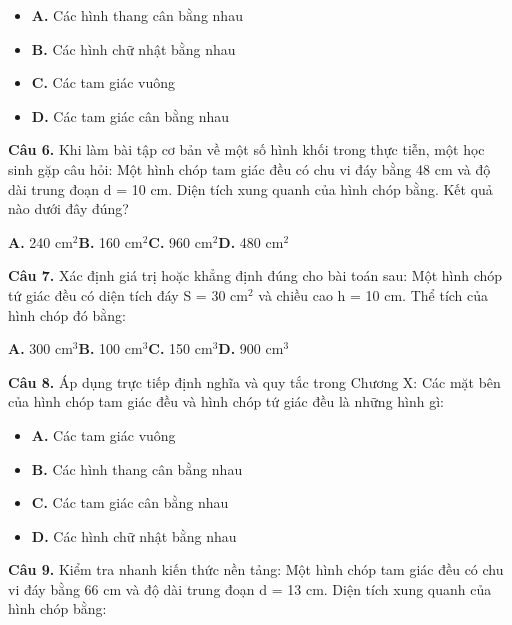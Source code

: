 \documentclass[11pt,a4paper]{article}
\begin{document}
\begin{itemize}\setlength{\itemsep}{1pt}\setlength{\parskip}{0pt}
  \item[] \textbf{A.} Các hình thang cân bằng nhau
  \item[] \textbf{B.} Các hình chữ nhật bằng nhau
  \item[] \textbf{C.} Các tam giác vuông
  \item[] \textbf{D.} Các tam giác cân bằng nhau
\end{itemize}\vspace{2pt}
\textbf{\color{primary} Câu 6.} Khi làm bài tập cơ bản về một số hình khối trong thực tiễn, một học sinh gặp câu hỏi: Một hình chóp tam giác đều có chu vi đáy bằng 48 cm và độ dài trung đoạn d = 10 cm. Diện tích xung quanh của hình chóp bằng. Kết quả nào dưới đây đúng?\par
\hspace*{1.5em}\textbf{A.} 240 cm$^2$\quad\quad \textbf{B.} 160 cm$^2$\quad\quad \textbf{C.} 960 cm$^2$\quad\quad \textbf{D.} 480 cm$^2$\par\vspace{2pt}
\textbf{\color{primary} Câu 7.} Xác định giá trị hoặc khẳng định đúng cho bài toán sau: Một hình chóp tứ giác đều có diện tích đáy S = 30 cm$^2$ và chiều cao h = 10 cm. Thể tích của hình chóp đó bằng:\par
\hspace*{1.5em}\textbf{A.} 300 cm$^3$\quad\quad \textbf{B.} 100 cm$^3$\quad\quad \textbf{C.} 150 cm$^3$\quad\quad \textbf{D.} 900 cm$^3$\par\vspace{2pt}
\textbf{\color{primary} Câu 8.} Áp dụng trực tiếp định nghĩa và quy tắc trong Chương X: Các mặt bên của hình chóp tam giác đều và hình chóp tứ giác đều là những hình gì:\par
\begin{itemize}\setlength{\itemsep}{1pt}\setlength{\parskip}{0pt}
  \item[] \textbf{A.} Các tam giác vuông
  \item[] \textbf{B.} Các hình thang cân bằng nhau
  \item[] \textbf{C.} Các tam giác cân bằng nhau
  \item[] \textbf{D.} Các hình chữ nhật bằng nhau
\end{itemize}\vspace{2pt}
\textbf{\color{primary} Câu 9.} Kiểm tra nhanh kiến thức nền tảng: Một hình chóp tam giác đều có chu vi đáy bằng 66 cm và độ dài trung đoạn d = 13 cm. Diện tích xung quanh của hình chóp bằng:\par
\end{document}
